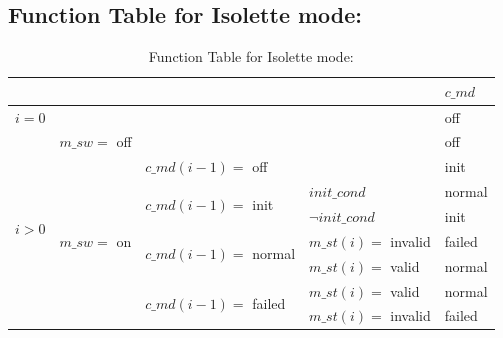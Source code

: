 \documentclass[fontsize=12pt,paper=letter,twoside]{scrartcl}
\begin{document}
\subsection{Function Table for Isolette mode: }
\begin{table}[htb!]
\centering
\begin{tabular}{llll|l|}
\cline{5-5}
                                                        &                                                  &                                                           &                    & $c\_md$  \\ \hline
\multicolumn{4}{|l|}{$i = 0$}                                                                                                                                                                 & off    \\ \hline
\multicolumn{1}{|l|}{\multirow{8}{*}{$i > 0$}} & \multicolumn{3}{l|}{$m\_sw =$ off}                                                                                                  & off    \\ \cline{2-5}
\multicolumn{1}{|l|}{}                                  & \multicolumn{1}{l|}{\multirow{7}{*}{$m\_sw =$ on}} & \multicolumn{2}{l|}{$c\_md(i-1) =$ off}                                          & init   \\ \cline{3-5}
\multicolumn{1}{|l|}{}                                  & \multicolumn{1}{l|}{}                            & \multicolumn{1}{l|}{\multirow{2}{*}{$c\_md(i-1) =$ init}}   & $init\_cond$ \footnotemark        & normal \\ \cline{4-5}
\multicolumn{1}{|l|}{}                                  & \multicolumn{1}{l|}{}                            & \multicolumn{1}{l|}{}                                     & $\neg init\_cond$     & init   \\ \cline{3-5}
\multicolumn{1}{|l|}{}                                  & \multicolumn{1}{l|}{}                            & \multicolumn{1}{l|}{\multirow{2}{*}{$c\_md(i-1) =$ normal}} & $m\_st(i) =$ invalid & failed   \\ \cline{4-5}
\multicolumn{1}{|l|}{}                                  & \multicolumn{1}{l|}{}                            & \multicolumn{1}{l|}{}                                     & $m\_st(i) =$ valid   & normal \\ \cline{3-5}
\multicolumn{1}{|l|}{}                                  & \multicolumn{1}{l|}{}                            & \multicolumn{1}{l|}{\multirow{2}{*}{$c\_md(i-1) =$ failed}}   & $m\_st(i) =$ valid   & normal \\ \cline{4-5}
\multicolumn{1}{|l|}{}                                  & \multicolumn{1}{l|}{}                            & \multicolumn{1}{l|}{}                                     & $m\_st(i) =$ invalid & failed   \\ \hline
\end{tabular}
\caption{Function Table for Isolette mode: }
\end{table}
\end{document}
